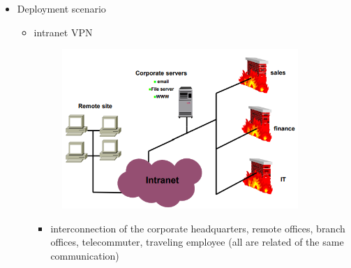 \documentclass{article}
\begin{document}
\begin{itemize}
\begin{itemize}
    \end{itemize}
    \item Deployment scenario
    \begin{itemize}
        \item intranet VPN
        \begin{figure}[H]
            \centering
            \includegraphics[width=0.90\textwidth]{figure/intranet.png}
        \end{figure}
        \begin{itemize}
            \item interconnection of the corporate headquarters, remote offices, branch offices, telecommuter, traveling employee (all are related of the same communication)
        \end{itemize}
        

\end{itemize}
\end{itemize}
\end{document}
